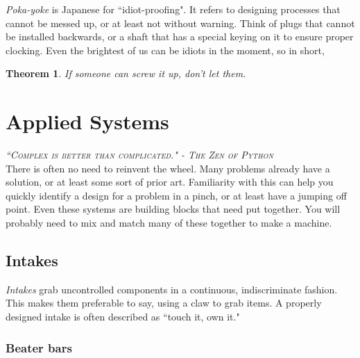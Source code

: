 \documentclass[10pt,letterpaper]{book}
\newtheorem{theorem}{Theorem}
\begin{document}
\textit{Poka-yoke} is Japanese for ``idiot-proofing". It refers to designing processes that cannot be messed up, or at least not without warning. Think of plugs that cannot be installed backwards, or a shaft that has a special keying on it to ensure proper clocking. Even the brightest of us can be idiots in the moment, so in short,

\begin{theorem}
If someone can screw it up, don't let them.
\end{theorem}

\chapter{Applied Systems}

 {\slshape \scshape ``Complex is better than complicated." - The Zen of Python}
 \\
 
 There is often no need to reinvent the wheel. Many problems already have a solution, or at least some sort of prior art. Familiarity with this can help you quickly identify a design for a problem in a pinch, or at least have a jumping off point. Even these systems are building blocks that need put together. You will probably need to mix and match many of these together to make a machine.

\section{Intakes} \label{section:intakes}

\textit{Intakes} grab uncontrolled components in a continuous, indiscriminate fashion. This makes them preferable to say, using a claw to grab items. A properly designed intake is often described as ``touch it, own it."

\subsection{Beater bars} 
\end{document}
